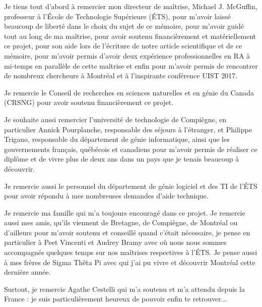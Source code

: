 Je tiens tout d'abord à remercier mon directeur de maîtrise, Michael J. McGuffin, professeur à l'École de Technologie Supérieure (ÉTS), pour m'avoir laissé beaucoup de liberté dans le choix du sujet de ce mémoire, pour m'avoir guidé tout au long de ma maîtrise, pour avoir soutenu financièrement et matériellement ce projet, pour son aide lors de l'écriture de notre article scientifique et de ce mémoire, pour m'avoir permis d'avoir deux expérience professionnelles en RA à mi-temps en parallèle de cette maîtrise et enfin pour m'avoir permis de rencontrer de nombreux chercheurs à Montréal et à l'inspirante conférence UIST 2017.

Je remercie le Conseil de recherches en sciences naturelles et en génie du Canada (CRSNG) pour avoir soutenu financièrement ce projet.

Je souhaite aussi remercier l'université de technologie de Compiègne, en particulier Annick Pourplanche, responsable des séjours à l'étranger, et Philippe Trigano, responsable du département de génie informatique, ainsi que les gouvernements français, québécois et canadiens pour m'avoir permis de réaliser ce diplôme et de vivre plus de deux ans dans un pays que je tenais beaucoup à découvrir.

Je remercie aussi le personnel du département de génie logiciel et des TI de l'ÉTS pour avoir répondu à mes nombreuses demandes d'aide technique.

Je remercie ma famille qui m'a toujours encouragé dans ce projet. Je remercie aussi mes amis, qu'ils viennent de Bretagne, de Compiègne, de Montréal ou d'ailleurs pour m'avoir soutenu et conseillé quand c'était nécessaire, je pense en particulier à Peet Vincenti et Audrey Bramy avec où nous nous sommes accompagnés quelques temps sur nos maîtrises respectives à l'ÉTS. Je pense aussi à mes frères de Sigma Thêta Pi avec qui j'ai pu vivre et découvrir Montréal cette dernière année. 

Surtout, je remercie Agathe Cestelli qui m'a soutenu et m'a attendu depuis la France : je suis particulièrement heureux de pouvoir enfin te retrouver...